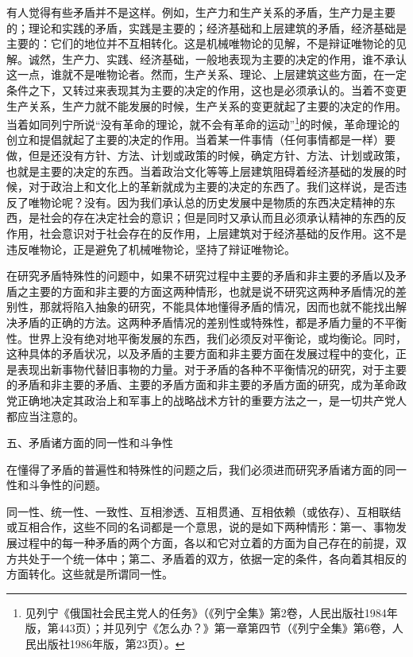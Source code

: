 \documentclass[UTF8, 12pt, a4paper]{ctexrep}
\begin{document}
有人觉得有些矛盾并不是这样。例如，生产力和生产关系的矛盾，生产力是主要的；理论和实践的矛盾，实践是主要的；经济基础和上层建筑的矛盾，经济基础是主要的：它们的地位并不互相转化。这是机械唯物论的见解，不是辩证唯物论的见解。诚然，生产力、实践、经济基础，一般地表现为主要的决定的作用，谁不承认这一点，谁就不是唯物论者。然而，生产关系、理论、上层建筑这些方面，在一定条件之下，又转过来表现其为主要的决定的作用，这也是必须承认的。当着不变更生产关系，生产力就不能发展的时候，生产关系的变更就起了主要的决定的作用。当着如同列宁所说“没有革命的理论，就不会有革命的运动”\footnote{见列宁《俄国社会民主党人的任务》（《列宁全集》第2卷，人民出版社1984年版，第443页）；并见列宁《怎么办？》第一章第四节（《列宁全集》第6卷，人民出版社1986年版，第23页）。}的时候，革命理论的创立和提倡就起了主要的决定的作用。当着某一件事情（任何事情都是一样）要做，但是还没有方针、方法、计划或政策的时候，确定方针、方法、计划或政策，也就是主要的决定的东西。当着政治文化等等上层建筑阻碍着经济基础的发展的时候，对于政治上和文化上的革新就成为主要的决定的东西了。我们这样说，是否违反了唯物论呢？没有。因为我们承认总的历史发展中是物质的东西决定精神的东西，是社会的存在决定社会的意识；但是同时又承认而且必须承认精神的东西的反作用，社会意识对于社会存在的反作用，上层建筑对于经济基础的反作用。这不是违反唯物论，正是避免了机械唯物论，坚持了辩证唯物论。

在研究矛盾特殊性的问题中，如果不研究过程中主要的矛盾和非主要的矛盾以及矛盾之主要的方面和非主要的方面这两种情形，也就是说不研究这两种矛盾情况的差别性，那就将陷入抽象的研究，不能具体地懂得矛盾的情况，因而也就不能找出解决矛盾的正确的方法。这两种矛盾情况的差别性或特殊性，都是矛盾力量的不平衡性。世界上没有绝对地平衡发展的东西，我们必须反对平衡论，或均衡论。同时，这种具体的矛盾状况，以及矛盾的主要方面和非主要方面在发展过程中的变化，正是表现出新事物代替旧事物的力量。对于矛盾的各种不平衡情况的研究，对于主要的矛盾和非主要的矛盾、主要的矛盾方面和非主要的矛盾方面的研究，成为革命政党正确地决定其政治上和军事上的战略战术方针的重要方法之一，是一切共产党人都应当注意的。

五、矛盾诸方面的同一性和斗争性

在懂得了矛盾的普遍性和特殊性的问题之后，我们必须进而研究矛盾诸方面的同一性和斗争性的问题。

同一性、统一性、一致性、互相渗透、互相贯通、互相依赖（或依存）、互相联结或互相合作，这些不同的名词都是一个意思，说的是如下两种情形：第一、事物发展过程中的每一种矛盾的两个方面，各以和它对立着的方面为自己存在的前提，双方共处于一个统一体中；第二、矛盾着的双方，依据一定的条件，各向着其相反的方面转化。这些就是所谓同一性。
\end{document}
